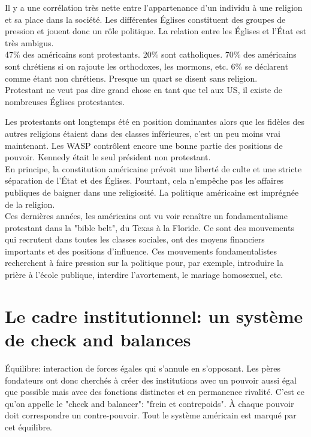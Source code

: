 \documentclass[10pt, a4paper, openany]{book}
\begin{document}
Il y a une corrélation très nette entre l'appartenance d'un individu à une religion et sa place dans la société. Les différentes Églises constituent des groupes de pression et jouent donc un rôle politique. La relation entre les Églises et l'État est très ambigus. \\
47\% des américains sont protestants. 20\% sont catholiques. 70\% des américains sont chrétiens si on rajoute les orthodoxes, les mormons, etc. 6\% se déclarent comme étant non chrétiens. Presque un quart se disent sans religion. \\
Protestant ne veut pas dire grand chose en tant que tel aux US, il existe de nombreuses Églises protestantes.


Les protestants ont longtemps été en position dominantes alors que les fidèles des autres religions étaient dans des classes inférieures, c'est un peu moins vrai maintenant. Les WASP contrôlent encore une bonne partie des positions de pouvoir. Kennedy était le seul président non protestant. \\
En principe, la constitution américaine prévoit une liberté de culte et une stricte séparation de l'État et des Églises. Pourtant, cela n'empêche pas les affaires publiques de baigner dans une religiosité. La politique américaine est imprégnée de la religion. \\
Ces dernières années, les américains ont vu voir renaître un fondamentalisme protestant dans la "bible belt", du Texas à la Floride. Ce sont des mouvements qui recrutent dans toutes les classes sociales, ont des moyens financiers importants et des positions d'influence. Ces mouvements fondamentalistes recherchent à faire pression sur la politique pour, par exemple, introduire la prière à l'école publique, interdire l'avortement, le mariage homosexuel, etc. 

\section{Le cadre institutionnel: un système de check and balances}

Équilibre: interaction de forces égales qui s'annule en s'opposant. Les pères fondateurs ont donc cherchés à créer des institutions avec un pouvoir aussi égal que possible mais avec des fonctions distinctes et en permanence rivalité. C'est ce qu'on appelle le "check and balancer": "frein et contrepoids". À chaque pouvoir doit correspondre un contre-pouvoir. Tout le système américain est marqué par cet équilibre. 
\end{document}
